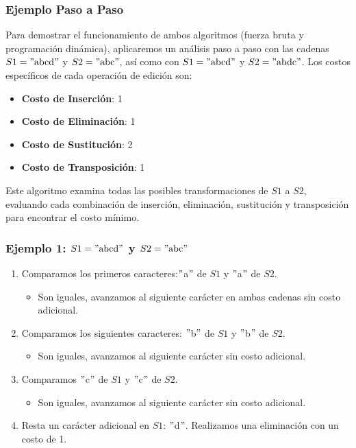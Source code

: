 \subsubsection{Ejemplo Paso a Paso}
Para demostrar el funcionamiento de ambos algoritmos (fuerza bruta y programación dinámica), aplicaremos un análisis paso a paso con las cadenas $S1 = \text{$"$abcd$"$}$ y $S2 = \text{$"$abc$"$}$, así como con $S1 = \text{$"$abcd$"$}$ y $S2 = \text{$"$abdc$"$}$. Los costos específicos de cada operación de edición son:

\begin{itemize}
    \item \textbf{Costo de Inserción}: 1
    \item \textbf{Costo de Eliminación}: 1
    \item \textbf{Costo de Sustitución}: 2
    \item \textbf{Costo de Transposición}: 1
\end{itemize}

Este algoritmo examina todas las posibles transformaciones de $S1$ a $S2$, evaluando cada combinación de inserción, eliminación, sustitución y transposición para encontrar el costo mínimo.

\subsubsection{Ejemplo 1: $S1 = \text{$"$abcd$"$}$ y $S2 = \text{$"$abc$"$}$}

\begin{enumerate}
    \item Comparamos los primeros caracteres:$"$a$"$ de $S1$ y $"$a$"$ de $S2$.
    \begin{itemize}
        \item Son iguales, avanzamos al siguiente carácter en ambas cadenas sin costo adicional.
    \end{itemize}
    \item Comparamos los siguientes caracteres: $"$b$"$ de $S1$ y $"$b$"$ de $S2$.
    \begin{itemize}
        \item Son iguales, avanzamos al siguiente carácter sin costo adicional.
    \end{itemize}
    \item Comparamos $"$c$"$ de $S1$ y $"$c$"$ de $S2$.
    \begin{itemize}
        \item Son iguales, avanzamos al siguiente carácter sin costo adicional.
    \end{itemize}
    \item Resta un carácter adicional en $S1$: $"$d$"$. Realizamos una eliminación con un costo de 1.
\end{enumerate}

